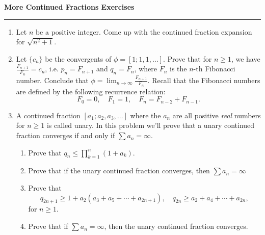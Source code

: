 \documentclass[12pt]{article}
\begin{document}
\begin{center}
{\bf \Large More Continued Fractions Exercises}
\vspace{0.2cm}
\hrule
\end{center}

\begin{enumerate}
	\item Let $n$ be a positive integer. Come up with the continued fraction expansion for $\sqrt{n^2+1}$.
	\vfill
	\item Let $\{c_n\}$ be the convergents of $\phi = [1; 1, 1, \ldots]$. Prove that for $n\geq 1$, we have $\frac{F_{n+1}}{F_n} = c_n$, i.e. $p_n = F_{n+1}$ and $q_n = F_{n}$, where $F_n$ is the $n$-th Fibonacci number. Conclude that $\phi = \lim_{n\to \infty}\frac{F_{n+1}}{F_n}$. Recall that the Fibonacci numbers are defined by the following recurrence relation:
	\[
	F_0=0,\quad F_1=1,\quad F_n = F_{n-2}+F_{n-1}.
	\]
	\vfill
	\item A continued fraction $[a_1; a_2, a_3, \ldots]$ where the $a_n$ are all positive \textit{real} numbers for $n\geq 1$ is called unary. In this problem we'll prove that a unary continued fraction converges if and only if $\sum a_n = \infty$.
	\begin{enumerate}
		\item Prove that $q_n \leq \prod_{k=1}^n(1+a_k)$.
		\vfill
		\item Prove that if the unary continued fraction converges, then $\sum a_n = \infty$
		\vfill
		\item Prove that
		\[
		q_{2n+1}\geq 1+a_2(a_3+a_5 + \cdots + a_{2n+1}),\quad q_{2n} \geq a_2 + a_4 + \cdots + a_{2n},
		\]
		for $n\geq 1$.
		\vfill
		\item Prove that if $\sum a_n =  \infty$, then the unary continued fraction converges.
	\end{enumerate}
	\vfill
\end{enumerate}
\end{document}
